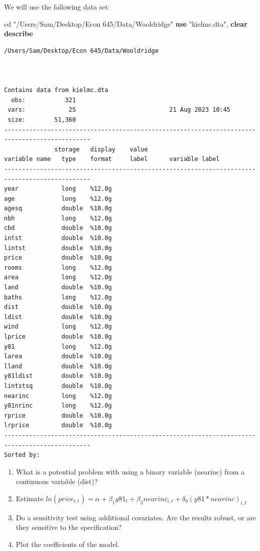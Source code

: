 \documentclass[
]{book}
\newenvironment{Shaded}{\begin{snugshade}}{\end{snugshade}}
\newcommand{\KeywordTok}[1]{\textcolor[rgb]{0.13,0.29,0.53}{\textbf{#1}}}
\newcommand{\NormalTok}[1]{#1}
\newcommand{\StringTok}[1]{\textcolor[rgb]{0.31,0.60,0.02}{#1}}
\begin{document}
We will use the following data set:

\begin{Shaded}
\begin{Highlighting}[]
\NormalTok{cd }\StringTok{"/Users/Sam/Desktop/Econ 645/Data/Wooldridge"}
\KeywordTok{use} \StringTok{"kielmc.dta"}\NormalTok{, }\KeywordTok{clear}
\KeywordTok{describe}
\end{Highlighting}
\end{Shaded}

\begin{verbatim}
/Users/Sam/Desktop/Econ 645/Data/Wooldridge



Contains data from kielmc.dta
  obs:           321                          
 vars:            25                          21 Aug 2023 10:45
 size:        51,360                          
----------------------------------------------------------------------------------------------
              storage   display    value
variable name   type    format     label      variable label
----------------------------------------------------------------------------------------------
year            long    %12.0g                
age             long    %12.0g                
agesq           double  %10.0g                
nbh             long    %12.0g                
cbd             double  %10.0g                
intst           double  %10.0g                
lintst          double  %10.0g                
price           double  %10.0g                
rooms           long    %12.0g                
area            long    %12.0g                
land            double  %10.0g                
baths           long    %12.0g                
dist            double  %10.0g                
ldist           double  %10.0g                
wind            long    %12.0g                
lprice          double  %10.0g                
y81             long    %12.0g                
larea           double  %10.0g                
lland           double  %10.0g                
y81ldist        double  %10.0g                
lintstsq        double  %10.0g                
nearinc         long    %12.0g                
y81nrinc        long    %12.0g                
rprice          double  %10.0g                
lrprice         double  %10.0g                
----------------------------------------------------------------------------------------------
Sorted by: 
\end{verbatim}

\begin{enumerate}
\def\labelenumi{\arabic{enumi}.}
\item
  What is a potential problem with using a binary variable (nearinc) from a continuous variable (dist)?
\item
  Estimate \(ln(price_{i,t}) = \alpha + \beta_{1} y81_{t} + \beta_2 nearinc_{i,t} + \delta_0 (y81*nearinc)_{i,t}\)
\item
  Do a sensitivity test using additional covariates. Are the results robust, or are they sensitive to the specification?
\item
  Plot the coefficients of the model.
\end{enumerate}
\end{document}
